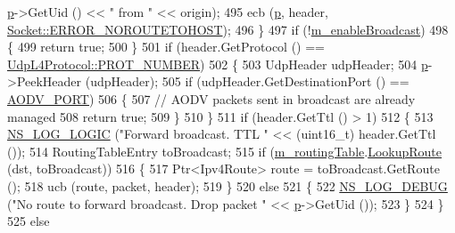 \begin{DoxyCode}
      \hyperlink{lte__link__budget_8m_ac9de518908a968428863f829398a4e62}{p}->GetUid () << \textcolor{stringliteral}{" from "} << origin);
495                 ecb (\hyperlink{lte__link__budget_8m_ac9de518908a968428863f829398a4e62}{p}, header, \hyperlink{classns3_1_1Socket_ada1328c5ae0c28cb2a982caf8f6d6ccaa0f8ecb5a4ddbce3bade35fa12c3d49e8}{Socket::ERROR\_NOROUTETOHOST});
496               \}
497             \textcolor{keywordflow}{if} (!\hyperlink{classns3_1_1aodv_1_1RoutingProtocol_a15b6c0f3a19ecf251f4492a71e95d080}{m\_enableBroadcast})
498               \{
499                 \textcolor{keywordflow}{return} \textcolor{keyword}{true};
500               \}
501             \textcolor{keywordflow}{if} (header.GetProtocol () == \hyperlink{classns3_1_1UdpL4Protocol_ad370801b3d1a166e831020a777c41047}{UdpL4Protocol::PROT\_NUMBER})
502               \{
503                 UdpHeader udpHeader;
504                 \hyperlink{lte__link__budget_8m_ac9de518908a968428863f829398a4e62}{p}->PeekHeader (udpHeader);
505                 \textcolor{keywordflow}{if} (udpHeader.GetDestinationPort () == \hyperlink{classns3_1_1aodv_1_1RoutingProtocol_ac4a3de99b49ad5f6efc9b71a700f7ec4}{AODV\_PORT})
506                   \{
507                     \textcolor{comment}{// AODV packets sent in broadcast are already managed}
508                     \textcolor{keywordflow}{return} \textcolor{keyword}{true};
509                   \}
510               \}
511             \textcolor{keywordflow}{if} (header.GetTtl () > 1)
512               \{
513                 \hyperlink{group__logging_ga88acd260151caf2db9c0fc84997f45ce}{NS\_LOG\_LOGIC} (\textcolor{stringliteral}{"Forward broadcast. TTL "} << (uint16\_t) header.GetTtl ());
514                 RoutingTableEntry toBroadcast;
515                 \textcolor{keywordflow}{if} (\hyperlink{classns3_1_1aodv_1_1RoutingProtocol_a4e1003a34c8adc96db71096d88c98ae0}{m\_routingTable}.\hyperlink{classns3_1_1aodv_1_1RoutingTable_a90cbc8a2c65cd68ccdaf768fcbb5d723}{LookupRoute} (dst, toBroadcast))
516                   \{
517                     Ptr<Ipv4Route> route = toBroadcast.GetRoute ();
518                     ucb (route, packet, header);
519                   \}
520                 \textcolor{keywordflow}{else}
521                   \{
522                     \hyperlink{group__logging_ga413f1886406d49f59a6a0a89b77b4d0a}{NS\_LOG\_DEBUG} (\textcolor{stringliteral}{"No route to forward broadcast. Drop packet "} << 
      \hyperlink{lte__link__budget_8m_ac9de518908a968428863f829398a4e62}{p}->GetUid ());
523                   \}
524               \}
525             \textcolor{keywordflow}{else}

\end{DoxyCode}
